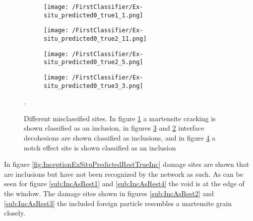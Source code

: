 \begin{figure}
\centering
\begin{subfigure}{.24\textwidth}
\texttt{[image: /FirstClassifier/Ex-situ\_predicted0\_true1\_1.png]}
\caption{}
\label{sub:MasInc}
\end{subfigure}
\centering
\begin{subfigure}{.24\textwidth}
\texttt{[image: /FirstClassifier/Ex-situ\_predicted0\_true2\_11.png]}
\caption{}
\label{sub:IDasInc2}
\end{subfigure}
\centering
\begin{subfigure}{.24\textwidth}
\texttt{[image: /FirstClassifier/Ex-situ\_predicted0\_true2\_5.png]}
\caption{}
\label{sub:IDasInc1}
\end{subfigure}
\centering
\begin{subfigure}{.24\textwidth}
\texttt{[image: /FirstClassifier/Ex-situ\_predicted0\_true3\_3.png]}
\caption{}
\label{sub:NasInc}
\end{subfigure}
\caption{Different misclassified sites. In figure \ref{sub:MasInc} a martensite cracking is shown classified as an inclusion, in figures \ref{sub:IDasInc1} and \ref{sub:IDasInc2} interface decohesions are shown classified as inclusions, and in figure \ref{sub:NasInc} a notch effect site is shown classified as an inclusion}. \\
\label{fig:InceptionExSituPredictedIncTrueRest}
\end{figure}

In figure \ref{fig:InceptionExSituPredictedRestTrueInc} damage sites are shown that are inclusions but have not been recognized by the network as such. As can be seen for figure \ref{sub:IncAsRest1} and \ref{sub:IncAsRest4} the void is at the edge of the window. The damage sites shown in figures \ref{sub:IncAsRest2} and \ref{sub:IncAsRest3} the included foreign particle resembles a martensite grain closely. \\

